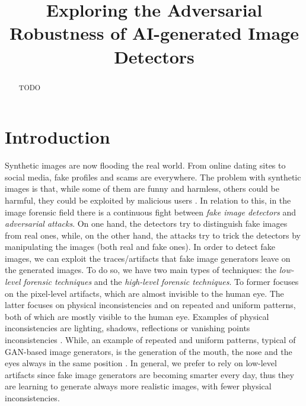 \documentclass[conference]{IEEEtran} %
\begin{document}
\title{Exploring the Adversarial Robustness of AI-generated Image Detectors}

\author{
}

\maketitle

\begin{abstract}
    TODO
\end{abstract}

\section{Introduction}
    Synthetic images are now flooding the real world. From online dating sites to social media, fake profiles and scams are everywhere. The problem with synthetic images is that, while some of them are funny and harmless, others could be harmful, they could be exploited by malicious users \cite{carlini2020evading}. In relation to this, in the image forensic field there is a continuous fight between \textit{fake image detectors} and \textit{adversarial attacks}. On one hand, the detectors try to distinguish fake images from real ones, while, on the other hand, the attacks try to trick the detectors by manipulating the images (both real and fake ones). In order to detect fake images, we can exploit the traces/artifacts that fake image generators leave on the generated images. To do so, we have two main types of techniques: the \textit{low-level forensic techniques} and the \textit{high-level forensic techniques}. To former focuses on the pixel-level artifacts, which are almost invisible to the human eye. The latter focuses on physical inconsistencies and on repeated and uniform patterns, both of which are mostly visible to the human eye. Examples of physical inconsistencies are lighting, shadows, reflections or vanishing points inconsistencies \cite{farid2022lighting}\cite{farid2022perspective}. While, an example of repeated and uniform patterns, typical of GAN-based image generators, is the generation of the mouth, the nose and the eyes always in the same position \cite{mundra2023exposing}. In general, we prefer to rely on low-level artifacts since fake image generators are becoming smarter every day, thus they are learning to generate always more realistic images, with fewer physical inconsistencies.
\end{document}
